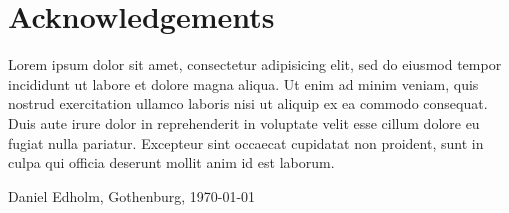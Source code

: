 \thispagestyle{plain}			%
\section*{Acknowledgements}
Lorem ipsum dolor sit amet, consectetur adipisicing elit, sed do eiusmod tempor incididunt ut labore et dolore magna aliqua. Ut enim ad minim veniam, quis nostrud exercitation ullamco laboris nisi ut aliquip ex ea commodo consequat. Duis aute irure dolor in reprehenderit in voluptate velit esse cillum dolore eu fugiat nulla pariatur. Excepteur sint occaecat cupidatat non proident, sunt in culpa qui officia deserunt mollit anim id est laborum.

\vspace{1.5cm}
\hfill
{}
Daniel Edholm, Gothenburg, \today
{}

\newpage				%
\thispagestyle{empty}
\mbox{}